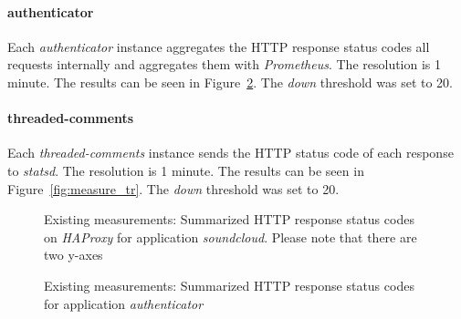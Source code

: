 \paragraph{authenticator} Each \emph{authenticator} instance aggregates the HTTP response status codes all requests internally and aggregates them with \emph{Prometheus}. The resolution is 1 minute. The results can be seen in Figure~\ref{fig:measure_auth}. The \emph{down} threshold was set to 20.

\paragraph{threaded-comments} Each \emph{threaded-comments} instance sends the HTTP status code of each response to \emph{statsd}. The resolution is 1 minute. The results can be seen in Figure~\ref{fig:measure_tr}. The \emph{down} threshold was set to 20.

\begin{figure}[ht]
  \caption{Existing measurements: Summarized HTTP response status codes on \emph{HAProxy} for application \emph{soundcloud}. Please note that there are two y-axes}
  \label{fig:measure_soundcloud}
\end{figure}

\begin{figure}[ht]
  \caption{Existing measurements: Summarized HTTP response status codes for application \emph{authenticator}}
  \label{fig:measure_auth}
\end{figure}


